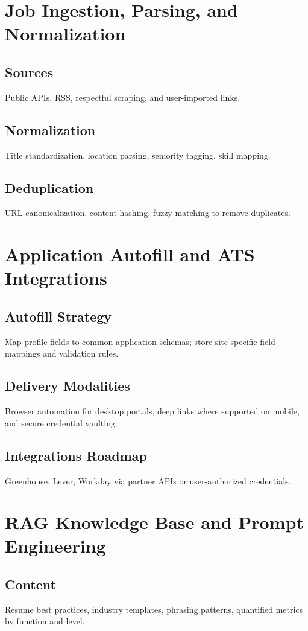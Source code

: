 \documentclass[12pt,a4paper]{article}
\begin{document}
\section{Job Ingestion, Parsing, and Normalization}
\subsection{Sources}
Public APIs, RSS, respectful scraping, and user-imported links.
\subsection{Normalization}
Title standardization, location parsing, seniority tagging, skill mapping.
\subsection{Deduplication}
URL canonicalization, content hashing, fuzzy matching to remove duplicates.

\section{Application Autofill and ATS Integrations}
\subsection{Autofill Strategy}
Map profile fields to common application schemas; store site-specific field mappings and validation rules.
\subsection{Delivery Modalities}
Browser automation for desktop portals, deep links where supported on mobile, and secure credential vaulting.
\subsection{Integrations Roadmap}
Greenhouse, Lever, Workday via partner APIs or user-authorized credentials.

\section{RAG Knowledge Base and Prompt Engineering}
\subsection{Content}
Resume best practices, industry templates, phrasing patterns, quantified metrics by function and level.
\end{document}
